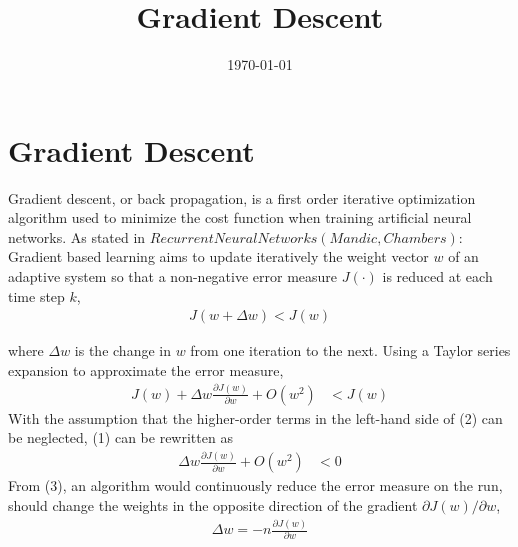 \documentclass[a4paper, 12pt]{article}
\begin{document}
\title{Gradient Descent}
\date{\today}
\pagestyle{empty} 
\section*{Gradient Descent}
	Gradient descent, or back propagation, is a first order iterative optimization algorithm used to minimize the cost function when training artificial neural networks.  As stated in $Recurrent Neural Networks (Mandic, Chambers)$:\\
	
	Gradient based learning aims to update iteratively the weight vector $w$ of an adaptive system so that a non-negative error measure $J(\cdot)$ is reduced at each time step $k$,
\begin{align}
J(w + \Delta w) < J(w)
\end{align}

where $\Delta w$ is the change in $w$ from one iteration to the next.  Using a Taylor series expansion to approximate the error measure,
\begin{align}
J(w) + \Delta w \frac{\partial J(w)}{\partial w} + O(w^2) &< J(w)
\end{align}
With the assumption that the higher-order terms in the left-hand side of (2) can be neglected, (1) can be rewritten as
\begin{align}
\Delta w \frac{\partial J(w)}{\partial w} + O(w^2) &< 0
\end{align}
From (3), an algorithm would continuously reduce the error measure on the run, should change the weights in the opposite direction of the gradient $\partial J(w) / \partial w$, 
\begin{align}
\Delta w = -n\frac{\partial J(w)}{\partial w}
\end{align}
\end{document}
